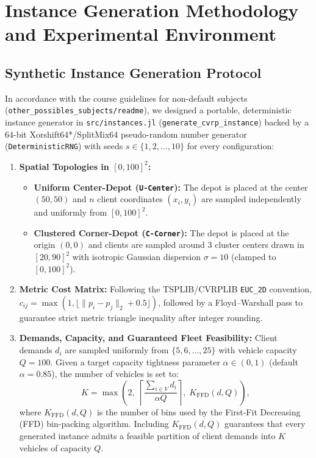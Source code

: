 \documentclass[11pt,a4paper]{article}
\begin{document}
\section{Instance Generation Methodology and Experimental Environment}

\subsection{Synthetic Instance Generation Protocol}
In accordance with the course guidelines for non-default subjects (\texttt{other\_possibles\_subjects/readme}), we designed a portable, deterministic instance generator in \texttt{src/instances.jl} (\texttt{generate\_cvrp\_instance}) backed by a 64-bit Xorshift64*/SplitMix64 pseudo-random number generator (\texttt{DeterministicRNG}) with seeds $s \in \{1, 2, \dots, 10\}$ for every configuration:
\begin{enumerate}[noitemsep,topsep=3pt]
    \item \textbf{Spatial Topologies in $[0, 100]^2$:}
    \begin{itemize}[noitemsep,topsep=1pt]
        \item \textbf{Uniform Center-Depot (\texttt{U-Center}):} The depot is placed at the center $(50, 50)$ and $n$ client coordinates $(x_i, y_i)$ are sampled independently and uniformly from $[0, 100]^2$.
        \item \textbf{Clustered Corner-Depot (\texttt{C-Corner}):} The depot is placed at the origin $(0, 0)$ and clients are sampled around $3$ cluster centers drawn in $[20, 90]^2$ with isotropic Gaussian dispersion $\sigma = 10$ (clamped to $[0, 100]^2$).
    \end{itemize}
    \item \textbf{Metric Cost Matrix:} Following the TSPLIB/CVRPLIB \texttt{EUC\_2D} convention, $c_{ij} = \max(1, \lfloor \lVert p_i - p_j \rVert_2 + 0.5 \rfloor)$, followed by a Floyd--Warshall pass to guarantee strict metric triangle inequality after integer rounding.
    \item \textbf{Demands, Capacity, and Guaranteed Fleet Feasibility:} Client demands $d_i$ are sampled uniformly from $\{5, 6, \dots, 25\}$ with vehicle capacity $Q = 100$. Given a target capacity tightness parameter $\alpha \in (0, 1)$ (default $\alpha = 0.85$), the number of vehicles is set to:
    \[
    K = \max\!\left(2, \; \left\lceil \frac{\sum_{i \in V} d_i}{\alpha Q} \right\rceil, \; K_{\text{FFD}}(d, Q)\right),
    \]
    where $K_{\text{FFD}}(d, Q)$ is the number of bins used by the First-Fit Decreasing (FFD) bin-packing algorithm. Including $K_{\text{FFD}}(d, Q)$ guarantees that every generated instance admits a feasible partition of client demands into $K$ vehicles of capacity $Q$.
\end{enumerate}
\end{document}
